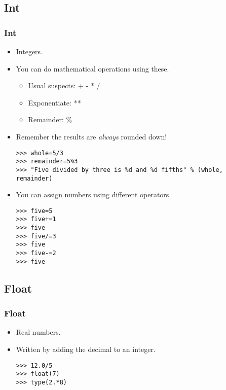 \documentclass[xcolor=x11names,compress]{beamer}
\renewcommand{\(}{\begin{columns}}
\renewcommand{\)}{\end{columns}}
\newcommand{\<}[1]{\begin{column}{#1}}
\renewcommand{\>}{\end{column}}
\begin{document}
\subsection{Int}
\begin{frame}[fragile]
  \frametitle{Int}
  \begin{itemize}
  	\item Integers. \pause
	\item You can do mathematical operations using these.
	\begin{itemize}
		\item Usual suspects: +  -  * /
		\item Exponentiate: **
		\item Remainder: \%		
	\end{itemize} \pause
	\item Remember the results are \emph{always}  rounded down! \pause
\footnotesize
\begin{verbatim}
>>> whole=5/3
>>> remainder=5%3
>>> "Five divided by three is %d and %d fifths" % (whole, remainder)
\end{verbatim}
\pause
	\item You can assign numbers using different operators. \pause
\footnotesize
\begin{verbatim}
>>> five=5
>>> five+=1
>>> five
>>> five/=3
>>> five
>>> five-=2
>>> five
\end{verbatim}
\end{itemize}
\end{frame}

\subsection{Float}
\begin{frame}[fragile]
  \frametitle{Float}
  \begin{itemize}
  	\item Real numbers. \pause 
	\item Written by adding the decimal to an integer. \pause
\begin{verbatim}
>>> 12.0/5
>>> float(7)
>>> type(2.*8)
\end{verbatim}	
  \end{itemize}
\end{frame}
\end{document}
